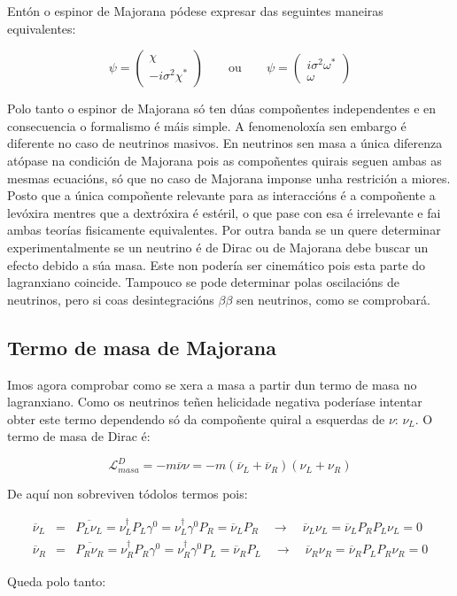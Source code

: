 \documentclass[a4paper,10pt]{article}
\newcommand{\beq}{\begin{equation}}
\newcommand{\eeq}{\end{equation}}
\newcommand{\bea}{\begin{eqnarray}}
\newcommand{\eea}{\end{eqnarray}}
\newcommand{\bmx}{\left(\begin{array}}
\newcommand{\emx}{\end{array}\right)}
\newcommand{\barra}[1]{\overline{#1}}
\newcommand{\h}[1]{#1^\dagger}
\newcommand{\chula}[1]{\mathcal{#1}}
\begin{document}
Entón o espinor de Majorana pódese expresar das seguintes maneiras equivalentes:

\beq
\psi = \bmx{c} \chi \\ -i \sigma^2 \chi^* \emx \qquad \text{ou} \qquad \psi = \bmx{c} i\sigma^2 \omega^* \\ \omega \emx
\eeq

	Polo tanto o espinor de Majorana só ten dúas compoñentes independentes e en consecuencia o formalismo é máis simple. A fenomenoloxía sen embargo é diferente no caso de neutrinos masivos. En neutrinos sen masa a única diferenza atópase na condición de Majorana pois as compoñentes quirais seguen ambas as mesmas ecuacións, só que no caso de Majorana imponse unha restrición a miores. Posto que a única compoñente relevante para as interaccións é a compoñente a levóxira mentres que a dextróxira é estéril, o que pase con esa é irrelevante e fai ambas teorías fisicamente equivalentes. Por outra banda se un quere determinar experimentalmente se un neutrino é de Dirac ou de Majorana debe buscar un efecto debido a súa masa. Este non podería ser cinemático pois esta parte do lagranxiano coincide. Tampouco se pode determinar polas oscilacións de neutrinos, pero si coas desintegracións $\beta\beta$ sen neutrinos, como se comprobará.

\subsection{Termo de masa de Majorana}

Imos agora comprobar como se xera a masa a partir dun termo de masa no lagranxiano. Como os neutrinos teñen helicidade negativa poderíase intentar obter este termo dependendo só da compoñente quiral a esquerdas de $\nu$: $\nu_L$. O termo de masa de Dirac é:

\beq
\chula L_{masa}^D = - m \barra\nu \nu = - m (\barra\nu_L + \barra\nu_R)(\nu_L + \nu_R)
\eeq

De aquí non sobreviven tódolos termos pois:

\bea
\barra\nu_L &=& \barra{P_L \nu_L} = \h\nu_L P_L \gamma^0 = \h\nu_L \gamma^0 P_R = \barra\nu_L P_R \quad \rightarrow \quad \barra\nu_L \nu_L = \barra\nu_L P_R P_L \nu_L = 0 \\
\barra\nu_R &=& \barra{P_R \nu_R} = \h\nu_R P_R \gamma^0 = \h\nu_R \gamma^0 P_L = \barra\nu_R P_L \quad \rightarrow \quad \barra\nu_R \nu_R = \barra\nu_R P_L P_R \nu_R = 0
\eea

Queda polo tanto:
\end{document}
